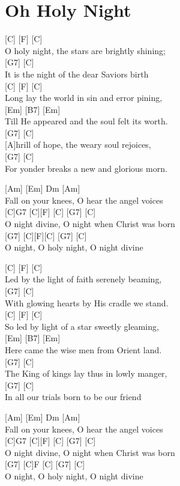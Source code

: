 \documentclass[
  letterpaper,
]{scrbook}
\begin{document}
\hypertarget{oh-holy-night}{%
\chapter{Oh Holy Night}\label{oh-holy-night}}

{[}C{]} {[}F{]} {[}C{]}\\
O holy night, the stars are brightly shining;\\
{[}G7{]} {[}C{]}\\
It is the night of the dear Saviors birth\\
{[}C{]} {[}F{]} {[}C{]}\\
Long lay the world in sin and error pining,\\
{[}Em{]} {[}B7{]} {[}Em{]}\\
Till He appeared and the soul felt its worth.\\
{[}G7{]} {[}C{]}\\
{[}A{]}hrill of hope, the weary soul rejoices,\\
{[}G7{]} {[}C{]}\\
For yonder breaks a new and glorious morn.

{[}Am{]} {[}Em{]} Dm {[}Am{]}\\
Fall on your knees, O hear the angel voices\\
{[}C{]}G7 {[}C{]}{[}F{]} {[}C{]} {[}G7{]} {[}C{]}\\
O night divine, O night when Christ was born\\
{[}G7{]} {[}C{]}{[}F{]}{[}C{]} {[}G7{]} {[}C{]}\\
O night, O holy night, O night divine

{[}C{]} {[}F{]} {[}C{]}\\
Led by the light of faith serenely beaming,\\
{[}G7{]} {[}C{]}\\
With glowing hearts by His cradle we stand.\\
{[}C{]} {[}F{]} {[}C{]}\\
So led by light of a star sweetly gleaming,\\
{[}Em{]} {[}B7{]} {[}Em{]}\\
Here came the wise men from Orient land.\\
{[}G7{]} {[}C{]}\\
The King of kings lay thus in lowly manger,\\
{[}G7{]} {[}C{]}\\
In all our trials born to be our friend

{[}Am{]} {[}Em{]} Dm {[}Am{]}\\
Fall on your knees, O hear the angel voices\\
{[}C{]}G7 {[}C{]}{[}F{]} {[}C{]} {[}G7{]} {[}C{]}\\
O night divine, O night when Christ was born\\
{[}G7{]} {[}C{]}F {[}C{]} {[}G7{]} {[}C{]}\\
O night, O holy night, O night divine
\end{document}
